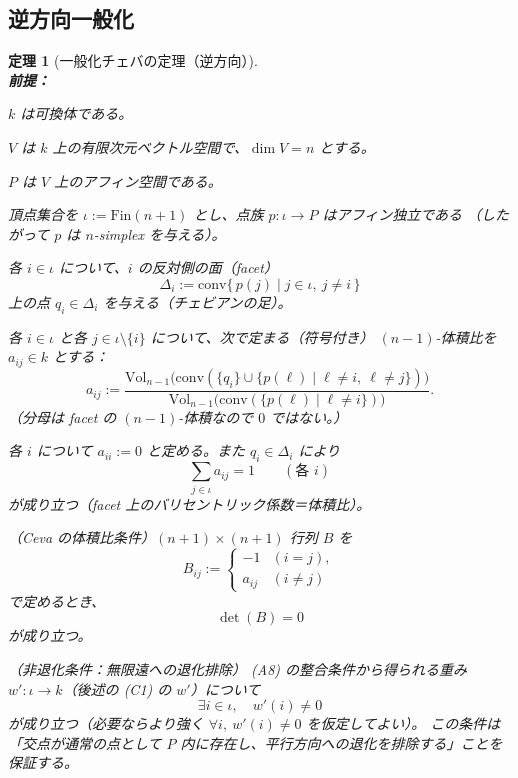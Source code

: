 \documentclass[a4paper,12pt]{bxjsbook}
\theoremstyle{theorem}
\newtheorem{theorem}{定理}[chapter]
\begin{document}
    \subsection{逆方向一般化}
    \begin{theorem}[一般化チェバの定理（逆方向）]
        \noindent\textbf{\\前提：}\par
        \begin{theoremenumerate}[label=(A\arabic*), leftmargin=4em, topsep=2pt, partopsep=0pt, itemsep=0pt, parsep=0pt]
            \item $k$ は可換体である。
            \item $V$ は $k$ 上の有限次元ベクトル空間で、$\dim V = n$ とする。
            \item $P$ は $V$ 上のアフィン空間である。
            \item 頂点集合を $\iota := \mathrm{Fin}(n+1)$ とし、点族 $p:\iota\to P$ はアフィン独立である
            （したがって $p$ は $n$-simplex を与える）。
            \item 各 $i\in\iota$ について、$i$ の反対側の面（facet）
            \[
              \Delta_i := \mathrm{conv}\{\,p(j)\mid j\in\iota,\ j\neq i\,\}
            \]
            上の点 $q_i\in \Delta_i$ を与える（チェビアンの足）。
            \item 各 $i\in\iota$ と各 $j\in \iota\setminus\{i\}$ について、次で定まる（符号付き）
            $(n-1)$-体積比を $a_{ij}\in k$ とする：
            \[
              a_{ij}
              :=
              \frac{\mathrm{Vol}_{n-1}\big(\mathrm{conv}(\{q_i\}\cup\{p(\ell)\mid \ell\neq i,\ \ell\neq j\})\big)}
                   {\mathrm{Vol}_{n-1}\big(\mathrm{conv}(\{p(\ell)\mid \ell\neq i\})\big)}.
            \]
            （分母は facet の $(n-1)$-体積なので $0$ ではない。）
            \item 各 $i$ について $a_{ii}:=0$ と定める。また $q_i\in\Delta_i$ により
            \[
              \sum_{j\in\iota} a_{ij} = 1
              \qquad(\text{各 }i)
            \]
            が成り立つ（facet 上のバリセントリック係数＝体積比）。
            \item （Ceva の体積比条件）$(n+1)\times(n+1)$ 行列 $B$ を
            \[
              B_{ij}:=
              \begin{cases}
                -1 & (i=j),\\
                a_{ij} & (i\neq j)
              \end{cases}
            \]
            で定めるとき、
            \[
              \det(B)=0
            \]
            が成り立つ。
            \item （非退化条件：無限遠への退化排除）
            (A8) の整合条件から得られる重み $w':\iota\to k$（後述の (C1) の $w'$）について
            \[
              \exists i\in\iota,\quad w'(i)\neq 0
            \]
            が成り立つ（必要ならより強く $\forall i,\ w'(i)\neq 0$ を仮定してよい）。
            この条件は「交点が通常の点として $P$ 内に存在し、平行方向への退化を排除する」ことを保証する。
        \end{theoremenumerate}


\end{theorem}
\end{document}
